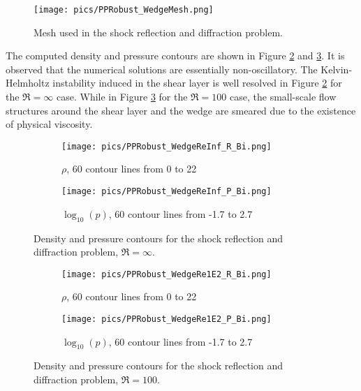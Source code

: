 \begin{figure}[htbp]
    \centering
    \texttt{[image: pics/PPRobust\_WedgeMesh.png]}
    \caption{Mesh used in the shock reflection and diffraction problem.}
    \label{fig:wedgeMesh}
\end{figure}

The computed density and pressure contours are shown in Figure \ref{fig:wedgeReInf} and \ref{fig:wedgeRe1E2}.
It is observed that the numerical solutions are essentially non-oscillatory.
The Kelvin-Helmholtz instability induced in the shear layer is well resolved in Figure \ref{fig:wedgeReInf} for the $\Re=\infty$ case.
While in Figure  \ref{fig:wedgeRe1E2} for the $\Re=100$ case,
the small-scale flow structures around the shear layer and the wedge are smeared  due to the existence of physical viscosity.

\begin{figure}[htbp]
    \centering
    \begin{subfigure}{0.5\textwidth}
        \texttt{[image: pics/PPRobust\_WedgeReInf\_R\_Bi.png]}
        \caption[]{$\rho$, 60 contour lines from 0 to 22}
    \end{subfigure}\hfill
    \begin{subfigure}{0.5\textwidth}
        \texttt{[image: pics/PPRobust\_WedgeReInf\_P\_Bi.png]}
        \caption[]{$\log_{10}(p)$, 60 contour lines from -1.7 to 2.7}
    \end{subfigure}
    \caption{Density and pressure contours for the shock reflection and diffraction problem, $\Re=\infty$.}
    \label{fig:wedgeReInf}
\end{figure}

\begin{figure}[htbp]
    \centering
    \begin{subfigure}{0.5\textwidth}
        \texttt{[image: pics/PPRobust\_WedgeRe1E2\_R\_Bi.png]}
        \caption[]{$\rho$, 60 contour lines from 0 to 22}
    \end{subfigure}\hfill
    \begin{subfigure}{0.5\textwidth}
        \texttt{[image: pics/PPRobust\_WedgeRe1E2\_P\_Bi.png]}
        \caption[]{$\log_{10}(p)$, 60 contour lines from -1.7 to 2.7}
    \end{subfigure}
    \caption{Density and pressure contours for the shock reflection and diffraction problem, $\Re=100$.}
    \label{fig:wedgeRe1E2}
\end{figure}

